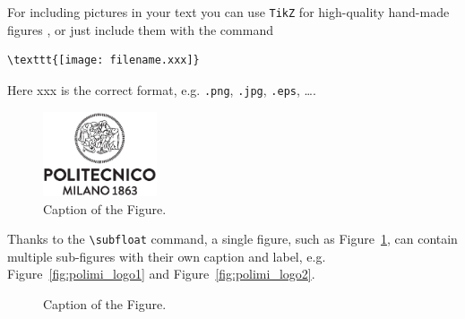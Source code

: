 \documentclass[11pt,a4paper]{article}
\begin{document}
For including pictures in your text you can use \texttt{TikZ} for high-quality hand-made figures \cite{tikz},
or just include them with the command
\begin{verbatim}
\texttt{[image: filename.xxx]}
\end{verbatim}
Here xxx is the correct format, e.g.  \verb|.png|, \verb|.jpg|, \verb|.eps|, \dots.

\begin{figure}[H]
\centering
\includegraphics[width=0.3\textwidth]{logo_polimi_scritta.eps}
\caption{Caption of the Figure.}
\label{fig:quadtree}
\end{figure}

Thanks to the \texttt{\textbackslash subfloat} command, a single figure, such as Figure~\ref{fig:quadtree},
can contain multiple sub-figures with their own caption and label, e.g. Figure~\ref{fig:polimi_logo1} and Figure~\ref{fig:polimi_logo2}.

\begin{figure}[H]
\centering
{}
\quad
{}
\caption[]{Caption of the Figure.}
\label{fig:quadtree2}
\end{figure}
\end{document}

